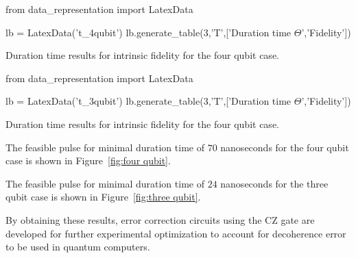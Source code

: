\begin{table}[!h]
  \label{tbl:four qubit}
  \centering
\begin{python}
from data_representation import LatexData

lb = LatexData('t_4qubit')
lb.generate_table(3,'T',['Duration time $\Theta$','Fidelity'])

\end{python}
\caption{Duration time results for intrinsic fidelity for the four qubit case.}
\end{table}

\begin{table}[!h]
  \label{tbl:three qubit}
  \centering
\begin{python}
from data_representation import LatexData

lb = LatexData('t_3qubit')
lb.generate_table(3,'T',['Duration time $\Theta$','Fidelity'])

\end{python}
\caption{Duration time results for intrinsic fidelity for the four qubit case.}
\end{table}



The feasible pulse for minimal duration time of $70$ nanoseconds for the four qubit case is shown in Figure~\ref{fig:four qubit}.



The feasible pulse for minimal duration time of $24$ nanoseconds for the three qubit case is shown in Figure~\ref{fig:three qubit}.


By obtaining these results, error correction circuits using the CZ gate are developed for further experimental optimization to account for decoherence error to be used in quantum computers.
